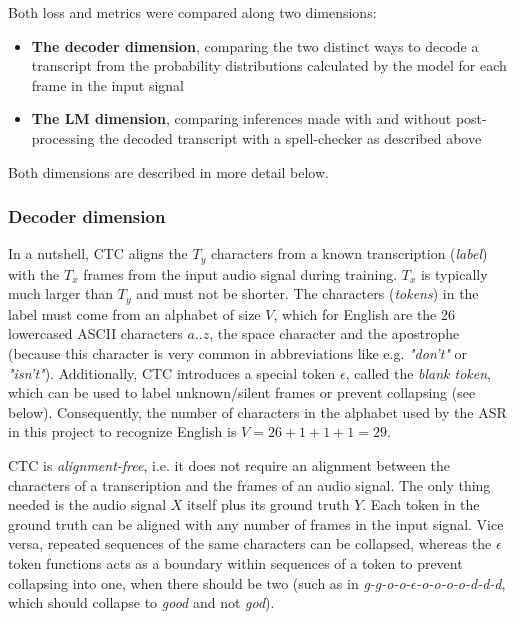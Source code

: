 Both loss and metrics were compared along two dimensions:

\begin{itemize}
	\item \textbf{The decoder dimension}, comparing the two distinct ways to decode a transcript from the probability distributions calculated by the model for each frame in the input signal
	\item \textbf{The LM dimension}, comparing inferences made with and without post-processing the decoded transcript with a spell-checker as described above
\end{itemize}

Both dimensions are described in more detail below.

\subsubsection{Decoder dimension}

In a nutshell, \ac{CTC} aligns the $T_y$ characters from a known transcription (\textit{label}) with the $T_x$ frames from the input audio signal during training. $T_x$ is typically much larger than $T_y$ and must not be shorter. The characters (\textit{tokens}) in the label must come from an alphabet of size $V$, which for English are the 26 lowercased ASCII characters $a..z$, the space character and the apostrophe (because this character is very common in abbreviations like e.g. \textit{"don't"} or \textit{"isn't"}). Additionally, \ac{CTC} introduces a special token $\epsilon$, called the \textit{blank token}, which can be used to label unknown/silent frames or prevent collapsing (see below). Consequently, the number of characters in the alphabet used by the \ac{ASR} in this project to recognize English is $V=26+1+1+1=29$.

\ac{CTC} is \textit{alignment-free}, i.e. it does not require an alignment between the characters of a transcription and the frames of an audio signal. The only thing needed is the audio signal $X$ itself plus its ground truth $Y$. Each token in the ground truth can be aligned with any number of frames in the input signal. Vice versa, repeated sequences of the same characters can be collapsed, whereas the $\epsilon$ token functions acts as a boundary within sequences of a token to prevent collapsing into one, when there should be two (such as in \textit{g-g-o-o-$\epsilon$-o-o-o-o-d-d-d}, which should collapse to \textit{good} and not \textit{god}). 

